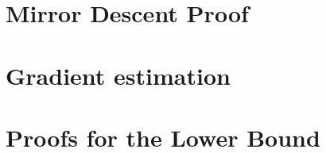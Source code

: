
\section{Mirror Descent Proof}
\label{sec:appendix-md}


\section{Gradient estimation}
\label{sec:appendix-grad}


\section{Proofs for the Lower Bound}
\label{sec:lb-proof}



